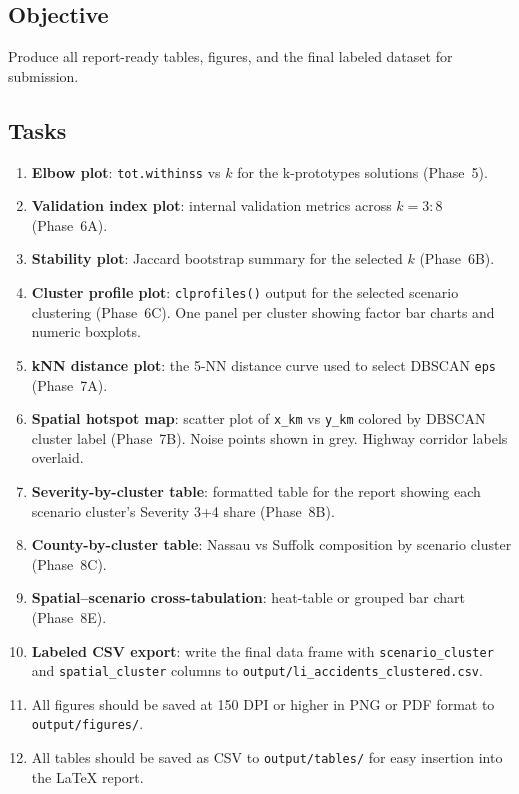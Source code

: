 \documentclass[11pt]{article}
\begin{document}
\subsection{Objective}

Produce all report-ready tables, figures, and the final labeled dataset for submission.

\subsection{Tasks}

\begin{enumerate}
  \item \textbf{Elbow plot}: \texttt{tot.withinss} vs $k$ for the k-prototypes solutions (Phase~5).

  \item \textbf{Validation index plot}: internal validation metrics across $k = 3:8$ (Phase~6A).

  \item \textbf{Stability plot}: Jaccard bootstrap summary for the selected $k$ (Phase~6B).

  \item \textbf{Cluster profile plot}: \texttt{clprofiles()} output for the selected scenario clustering (Phase~6C). One panel per cluster showing factor bar charts and numeric boxplots.

  \item \textbf{kNN distance plot}: the 5-NN distance curve used to select DBSCAN \texttt{eps} (Phase~7A).

  \item \textbf{Spatial hotspot map}: scatter plot of \texttt{x\_km} vs \texttt{y\_km} colored by DBSCAN cluster label (Phase~7B). Noise points shown in grey. Highway corridor labels overlaid.

  \item \textbf{Severity-by-cluster table}: formatted table for the report showing each scenario cluster's Severity 3+4 share (Phase~8B).

  \item \textbf{County-by-cluster table}: Nassau vs Suffolk composition by scenario cluster (Phase~8C).

  \item \textbf{Spatial--scenario cross-tabulation}: heat-table or grouped bar chart (Phase~8E).

  \item \textbf{Labeled CSV export}: write the final data frame with \texttt{scenario\_cluster} and \texttt{spatial\_cluster} columns to \texttt{output/li\_accidents\_clustered.csv}.

  \item All figures should be saved at 150 DPI or higher in PNG or PDF format to \texttt{output/figures/}.

  \item All tables should be saved as CSV to \texttt{output/tables/} for easy insertion into the LaTeX report.
\end{enumerate}
\end{document}
